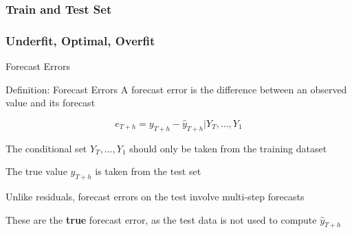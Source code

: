 \documentclass{beamer}
\newenvironment{wideitemize}{\itemize\addtolength{\itemsep}{10pt}}{\enditemize}
\begin{document}
\begin{frame}
  \frametitle{Train and Test Set}
\end{frame}

\begin{frame}
  \frametitle{Underfit, Optimal, Overfit}
\end{frame}

\begin{frame}{Forecast Errors}

  \begin{block}{Definition: Forecast Errors}
    A forecast error is the difference between an observed value and its forecast

    \begin{equation*}
      e_{T+h} = y_{T+h} - \hat{y}_{T+h}|Y_T, \dots, Y_1
    \end{equation*}
  \end{block}

\medskip
  
\begin{wideitemize}
    \item The conditional set $Y_T, \dots, Y_1$ should only be taken from the training dataset
    \item The true value $y_{T+h}$ is taken from the test set
    \item Unlike residuals, forecast errors on the test involve multi-step forecasts
    \item These are the \textbf{true} forecast error, as the test data is not used to compute $\hat{y}_{T+h}$
  \end{wideitemize}
  
\end{frame}
\end{document}
